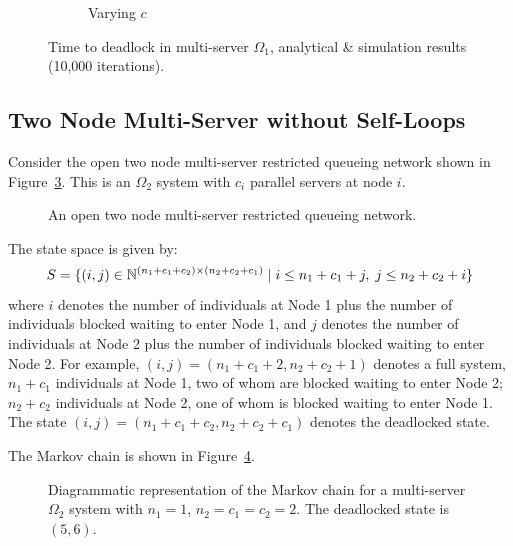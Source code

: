 \documentclass{article}
\numberwithin{equation}{section}
\begin{document}
\begin{figure}[!htbp]
\begin{center}
\begin{subfigure}[b]{0.35\textwidth}
    \caption{Varying $c$}
    \label{fig:1Nms_c}
  \end{subfigure}
  \end{center}
  \caption{Time to deadlock in multi-server $\Omega_1$, analytical \& simulation results (10,000 iterations).}
  \label{fig:timestodeadlock1nodemultiserver}
\end{figure}


\subsection{Two Node Multi-Server without Self-Loops}\label{sec:2nodeMS}

Consider the open two node multi-server restricted queueing network shown in Figure~\ref{fig:queueingnetwork_2nodemulti}.
This is an $\Omega_2$ system with $c_i$ parallel servers at node $i$.

\begin{figure}[!htbp]
  \begin{center}
  
  \end{center}
  \caption{An open two node multi-server restricted queueing network.}
  \label{fig:queueingnetwork_2nodemulti}
\end{figure}

The state space is given by:
        \[S = \{(i,j)\in\mathbb{N}^{(n_1+c_1+c_2)\times (n_2+c_2+c_1)} \nonscript\; | \nonscript\; i \leq n_1+c_1+j, \nonscript\; j \leq n_2+c_2+i\}\]
where $i$ denotes the number of individuals at Node 1 plus the number of individuals blocked waiting to enter Node 1, and $j$ denotes the number of individuals at Node 2 plus the number of individuals blocked waiting to enter Node 2.
For example, $(i, j) = (n_1+c_1+2, n_2+c_2+1)$ denotes a full system, $n_1+c_1$ individuals at Node 1, two of whom are blocked waiting to enter Node 2; $n_2+c_2$ individuals at Node 2, one of whom is blocked waiting to enter Node 1.
The state $(i, j) = (n_1+c_1+c_2, n_2+c_2+c_1)$ denotes the deadlocked state.

The Markov chain is shown in Figure~\ref{fig:2nodeMCms}.

\begin{figure}[!htbp]
    
    \caption{Diagrammatic representation of the Markov chain for a multi-server $\Omega_2$ system with $n_1=1$, $n_2=c_1=c_2=2$. The deadlocked state is $(5,6)$.}
    \label{fig:2nodeMCms}
\end{figure}
\end{document}
